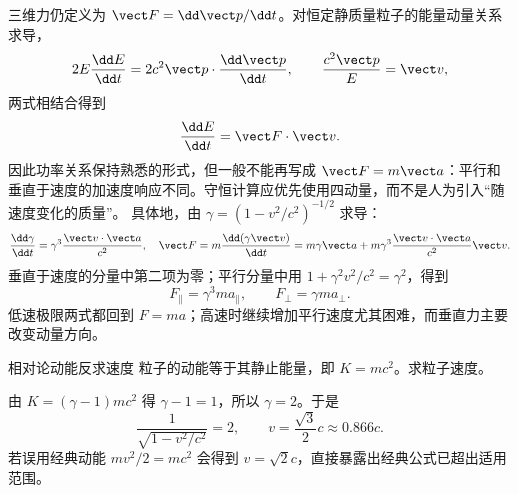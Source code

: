 三维力仍定义为 $\vect F=\dd\vect p/\dd t$。对恒定静质量粒子的能量动量关系求导，
\[
 2E\frac{\dd E}{\dd t}=2c^2\vect p\cdot\frac{\dd\vect p}{\dd t},
 \qquad \frac{c^2\vect p}{E}=\vect v,
\]
两式相结合得到
\begin{equation}
 \frac{\dd E}{\dd t}=\vect F\cdot\vect v.
\end{equation}
因此功率关系保持熟悉的形式，但一般不能再写成 $\vect F=m\vect a$：平行和垂直于速度的加速度响应不同。守恒计算应优先使用四动量，而不是人为引入“随速度变化的质量”。
具体地，由 $\gamma=(1-v^2/c^2)^{-1/2}$ 求导：
\[
 \frac{\dd\gamma}{\dd t}=\gamma^3\frac{\vect v\cdot\vect a}{c^2},
 \quad \vect F=m\frac{\dd(\gamma\vect v)}{\dd t}
 =m\gamma\vect a+m\gamma^3\frac{\vect v\cdot\vect a}{c^2}\vect v.
\]
垂直于速度的分量中第二项为零；平行分量中用 $1+\gamma^2v^2/c^2=\gamma^2$，得到
\begin{equation}
 F_{\parallel}=\gamma^3ma_{\parallel},
 \qquad
 F_{\perp}=\gamma ma_{\perp}.
\end{equation}
低速极限两式都回到 $F=ma$；高速时继续增加平行速度尤其困难，而垂直力主要改变动量方向。

\begin{origexamplebox}{相对论动能反求速度}
粒子的动能等于其静止能量，即 $K=mc^2$。求粒子速度。
\end{origexamplebox}
\begin{xesolution}
由 $K=(\gamma-1)mc^2$ 得 $\gamma-1=1$，所以 $\gamma=2$。于是
\[
 \frac1{\sqrt{1-v^2/c^2}}=2,
 \qquad
 \boxed{v=\frac{\sqrt3}{2}c\approx0.866c}.
\]
若误用经典动能 $mv^2/2=mc^2$ 会得到 $v=\sqrt2c$，直接暴露出经典公式已超出适用范围。
\end{xesolution}




